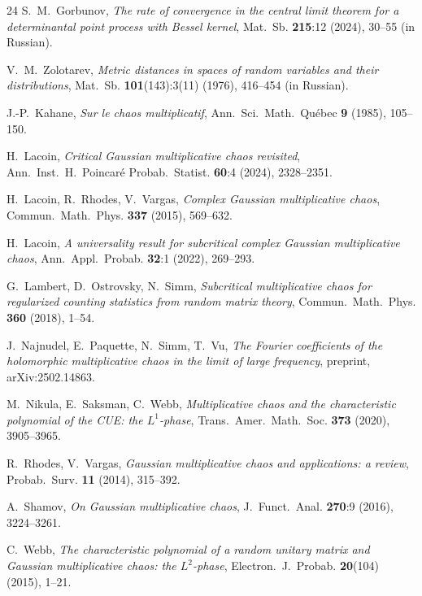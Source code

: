 \documentclass[12pt,a4paper]{article}
\theoremstyle{definition}
\theoremstyle{remark}
\begin{document}
\begin{thebibliography}{24}
		S.~M.~Gorbunov,
		\textit{The rate of convergence in the central limit theorem for a determinantal point process with Bessel kernel},
		Mat.~Sb. \textbf{215}:12 (2024), 30--55 (in Russian).
		
		V.~M.~Zolotarev,
		\textit{Metric distances in spaces of random variables and their distributions},
		Mat.~Sb. \textbf{101}(143):3(11) (1976), 416--454 (in Russian).
		
		J.-P.~Kahane,
		\textit{Sur le chaos multiplicatif},
		Ann.~Sci.~Math.~Québec \textbf{9} (1985), 105--150.
		
		H.~Lacoin,
		\textit{Critical Gaussian multiplicative chaos revisited},
		Ann.~Inst.~H.~Poincaré Probab.~Statist. \textbf{60}:4 (2024), 2328--2351.
		
		H.~Lacoin, R.~Rhodes, V.~Vargas,
		\textit{Complex Gaussian multiplicative chaos},
		Commun.~Math.~Phys. \textbf{337} (2015), 569--632.
		
		H.~Lacoin,
		\textit{A universality result for subcritical complex Gaussian multiplicative chaos},
		Ann.~Appl.~Probab. \textbf{32}:1 (2022), 269--293.
		
		G.~Lambert, D.~Ostrovsky, N.~Simm,
		\textit{Subcritical multiplicative chaos for regularized counting statistics from random matrix theory},
		Commun.~Math.~Phys. \textbf{360} (2018), 1--54.
		
		J.~Najnudel, E.~Paquette, N.~Simm, T.~Vu,
		\textit{The Fourier coefficients of the holomorphic multiplicative chaos in the limit of large frequency},
		preprint, arXiv:2502.14863.
		
		M.~Nikula, E.~Saksman, C.~Webb,
		\textit{Multiplicative chaos and the characteristic polynomial of the CUE: the $L^1$-phase},
		Trans.~Amer.~Math.~Soc. \textbf{373} (2020), 3905--3965.
		
		R.~Rhodes, V.~Vargas,
		\textit{Gaussian multiplicative chaos and applications: a review},
		Probab.~Surv. \textbf{11} (2014), 315--392.
		
		A.~Shamov,
		\textit{On Gaussian multiplicative chaos},
		J.~Funct.~Anal. \textbf{270}:9 (2016), 3224--3261.
		
		C.~Webb,
		\textit{The characteristic polynomial of a random unitary matrix and Gaussian multiplicative chaos: the $L^2$-phase},
		Electron.~J.~Probab. \textbf{20}(104) (2015), 1--21.
		
	\end{thebibliography}
	
\end{document}

